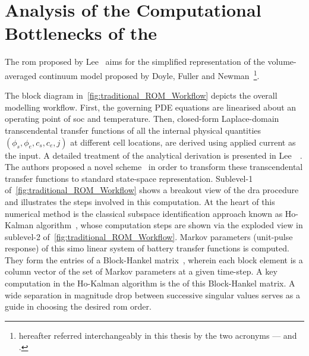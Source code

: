 \section{Analysis of the Computational Bottlenecks of the } \label{sec:Analysis-of-the}

The \gls{rom}  proposed by  Lee~\etal{} aims  for the  simplified representation
of  the    volume-averaged  continuum  model  proposed  by  Doyle,
Fuller   and   Newman~\cite{Doyle1993a,Fuller1994}\footnote{hereafter   referred
interchangeably in  this thesis  by the two  acronyms ---   and
.}.


The  block diagram  in~\cref{fig:traditional_ROM_Workflow}  depicts the  overall
modelling workflow. First,  the governing PDE equations are  linearised about an
operating point  of \gls{soc} and temperature.  Then, closed-form Laplace-domain
transcendental  transfer  functions  of  all the  internal  physical  quantities
$\left(\phi_{s},\phi_{e},c_{s},c_{e},j\right)$  at   different  cell  locations,
are  derived  using applied  current  as  the  input.  A detailed  treatment  of
the  analytical  derivation  is   presented  in  Lee~\etal~\cite{Lee2012a}.  The
authors  proposed  a novel    scheme~\cite{Lee2012b}  in order  to
transform  these  transcendental  transfer  functions  to  standard  state-space
representation.   Sublevel-1   of~\cref{fig:traditional_ROM_Workflow}  shows   a
breakout view of  the \gls{dra} procedure and illustrates the  steps involved in
this  computation. At  the  heart  of this  numerical  method  is the  classical
subspace  identification approach  known as  Ho-Kalman algorithm~\cite{HO1966a},
whose  computation  steps  are  shown   via  the  exploded  view  in  sublevel-2
of~\cref{fig:traditional_ROM_Workflow}. Markov  parameters (unit-pulse response)
of this \gls{simo} linear system of battery transfer functions is computed. They
form the entries  of a Block-Hankel matrix~\cite{Ljung1998},  wherein each block
element is a column vector of the set of Markov parameters at a given time-step.
A  key computation  in the  Ho-Kalman algorithm  is the   of  this
Block-Hankel  matrix. A  wide separation  in magnitude  drop between  successive
singular values serves as a guide in choosing the desired \gls{rom} order.

